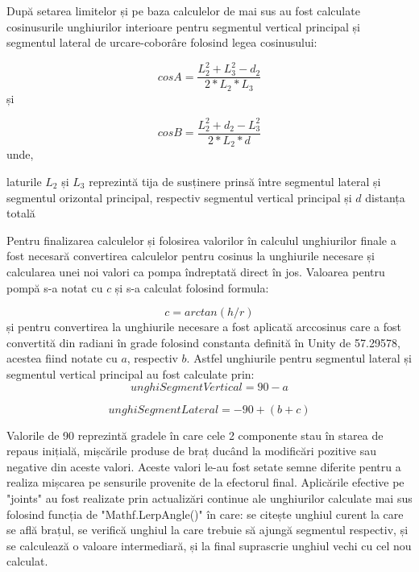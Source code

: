 După setarea limitelor și pe baza calculelor de mai sus au fost calculate cosinusurile unghiurilor interioare pentru segmentul vertical principal și segmentul lateral de urcare-coborâre folosind legea cosinusului:

\begin{equation}
	cosA = \frac{L_2^2+L_3^2 - d_2}{2*L_2*L_3}
\end{equation}
și


\begin{equation}
		cosB = \frac{L_2^2+ d_2 -L_3^2}{2*L_2*d}
\end{equation}
unde, 

laturile $L_2$ și $L_3$ reprezintă tija de susținere prinsă între segmentul lateral și segmentul orizontal principal, respectiv segmentul vertical principal și $d$ distanța totală
  
  
  
 Pentru finalizarea calculelor și folosirea valorilor în calculul unghiurilor finale  a fost necesară convertirea calculelor pentru cosinus la  unghiurile necesare și calcularea unei noi valori ca pompa îndreptată direct în jos. Valoarea pentru pompă s-a notat cu $c$ și s-a calculat  folosind formula:
 
 \begin{equation}
 	c =  arctan(h/r)
 \end{equation}
 și pentru convertirea la unghiurile necesare a fost aplicată arccosinus care a fost convertită din radiani în grade folosind constanta definită în Unity de 57.29578, acestea fiind notate cu $a$, respectiv $b$.
 Astfel unghiurile pentru segmentul lateral și segmentul vertical principal au fost calculate prin:
 \begin{equation}
 	unghiSegmentVertical = 90 - a 
 \end{equation}
 
 
  \begin{equation}
 	unghiSegmentLateral = -90 + (b+c)
 \end{equation}
 
Valorile de 90 reprezintă gradele în care cele 2 componente stau în starea de repaus inițială, mișcările produse de braț ducând la modificări pozitive sau negative din aceste valori. Aceste valori le-au fost setate semne diferite pentru a realiza mișcarea pe sensurile provenite de la efectorul final.
Aplicările efective pe "joints" au fost realizate prin actualizări continue ale unghiurilor calculate mai sus folosind funcția de "Mathf.LerpAngle()" în care: se citește unghiul curent la care se află brațul, se verifică unghiul la care trebuie să ajungă segmentul respectiv, și se calculează o valoare intermediară, și la final suprascrie unghiul vechi cu cel nou calculat.


